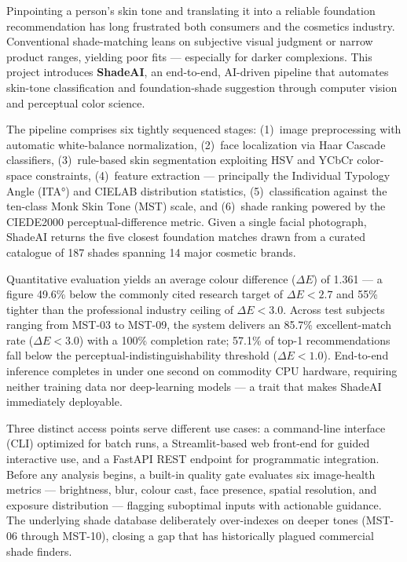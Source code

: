 Pinpointing a person's skin tone and translating it into a reliable foundation recommendation has long frustrated both consumers and the cosmetics industry. Conventional shade-matching leans on subjective visual judgment or narrow product ranges, yielding poor fits — especially for darker complexions. This project introduces \textbf{ShadeAI}, an end-to-end, AI-driven pipeline that automates skin-tone classification and foundation-shade suggestion through computer vision and perceptual color science.

\vspace{0.5cm}

The pipeline comprises six tightly sequenced stages: (1)~image preprocessing with automatic white-balance normalization, (2)~face localization via Haar Cascade classifiers, (3)~rule-based skin segmentation exploiting HSV and YCbCr color-space constraints, (4)~feature extraction — principally the Individual Typology Angle (ITA°) and CIELAB distribution statistics, (5)~classification against the ten-class Monk Skin Tone (MST) scale, and (6)~shade ranking powered by the CIEDE2000 perceptual-difference metric. Given a single facial photograph, ShadeAI returns the five closest foundation matches drawn from a curated catalogue of 187 shades spanning 14 major cosmetic brands.

\vspace{0.5cm}

Quantitative evaluation yields an average colour difference ($\Delta E$) of 1.361 — a figure 49.6\% below the commonly cited research target of $\Delta E < 2.7$ and 55\% tighter than the professional industry ceiling of $\Delta E < 3.0$. Across test subjects ranging from MST-03 to MST-09, the system delivers an 85.7\% excellent-match rate ($\Delta E < 3.0$) with a 100\% completion rate; 57.1\% of top-1 recommendations fall below the perceptual-indistinguishability threshold ($\Delta E < 1.0$). End-to-end inference completes in under one second on commodity CPU hardware, requiring neither training data nor deep-learning models — a trait that makes ShadeAI immediately deployable.

\vspace{0.5cm}

Three distinct access points serve different use cases: a command-line interface (CLI) optimized for batch runs, a Streamlit-based web front-end for guided interactive use, and a FastAPI REST endpoint for programmatic integration. Before any analysis begins, a built-in quality gate evaluates six image-health metrics — brightness, blur, colour cast, face presence, spatial resolution, and exposure distribution — flagging suboptimal inputs with actionable guidance. The underlying shade database deliberately over-indexes on deeper tones (MST-06 through MST-10), closing a gap that has historically plagued commercial shade finders.

